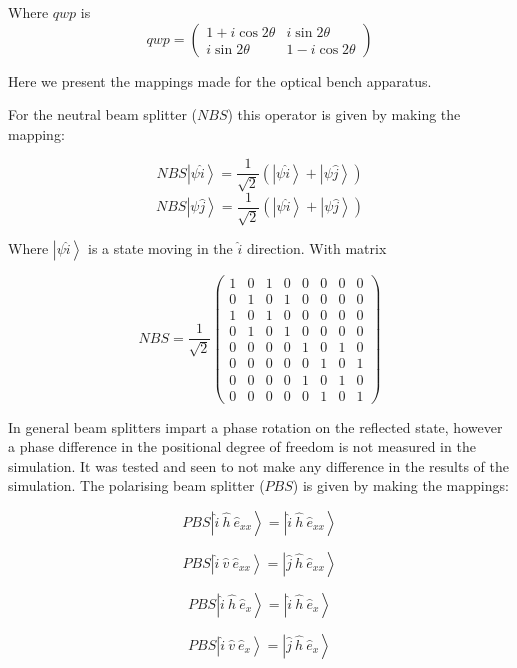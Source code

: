\documentclass[12pt, twoside]{article}
\numberwithin{equation}{section}
\begin{document}
Where $qwp$ is
\[qwp = \begin{pmatrix} 1 + i \cos{2 \theta} & i \sin{2 \theta} \\ i \sin{2 \theta} & 1- i \cos{2 \theta} \end{pmatrix}\]

Here we present the mappings made for the optical bench apparatus.

For the neutral beam splitter ($NBS$) this operator is given by making
the mapping:

\[ NBS \left| \psi \hat{i} \right\rangle = \frac{1}{\sqrt{2}}( \left| \psi \hat{i} \right\rangle + \left| \psi \hat{j} \right\rangle )\]
\[ NBS \left| \psi \hat{j} \right\rangle = \frac{1}{\sqrt{2}}( \left| \psi \hat{i} \right\rangle + \left| \psi \hat{j} \right\rangle )\]

Where $\left| \psi \hat{i} \right\rangle$ is a state moving in the
$\hat{i}$ direction. With matrix

\[NBS = \frac{1}{\sqrt{2}}\begin{pmatrix}
1 & 0 & 1 & 0& 0& 0& 0& 0\\0& 1& 0& 1& 0& 0& 0& 0\\1& 0& 1& 0& 0& 0& 0& 0\\0& 1& 0& 1& 0& 0& 0& 0\\0& 0& 0& 0& 1& 0& 1& 0\\0& 0& 0& 0& 0& 1& 0& 1\\0& 0& 0& 0& 1& 0& 1& 0\\0& 0& 0& 0& 0& 1& 0& 1\end{pmatrix}\]

In general beam splitters impart a phase rotation on the reflected
state, however a phase difference in the positional degree of freedom is
not measured in the simulation. It was tested and seen to not make any
difference in the results of the simulation. The polarising beam
splitter ($PBS$) is given by making the mappings:

\[ PBS \left| \hat{i} \ \hat{h} \ \hat{e}_{xx} \right\rangle = \left| \hat{i} \ \hat{h} \ \hat{e}_{xx}  \right\rangle\]

\[ PBS \left| \hat{i} \ \hat{v} \ \hat{e}_{xx} \right\rangle = \left| \hat{j} \ \hat{h} \ \hat{e}_{xx}  \right\rangle\]

\[ PBS \left| \hat{i} \ \hat{h} \ \hat{e}_{x} \right\rangle = \left| \hat{i} \ \hat{h} \ \hat{e}_{x}  \right\rangle\]

\[ PBS \left| \hat{i} \ \hat{v} \ \hat{e}_{x} \right\rangle = \left| \hat{j} \ \hat{h} \ \hat{e}_{x}  \right\rangle\]
\end{document}
